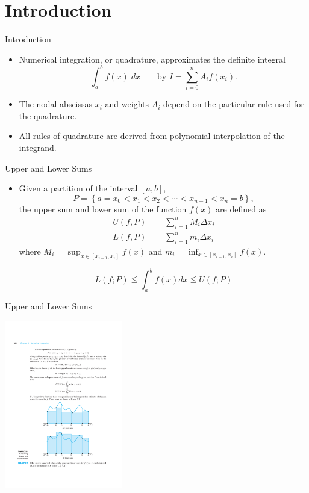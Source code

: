 \documentclass{beamer}
\newcommand{\beforeverb}{\footnotesize}
\newcommand{\afterverb}{\normalsize}
\begin{document}
\section[Introduction]{Introduction}
\begin{frame}{Introduction}
\begin{itemize}
\item Numerical integration, or \alert{quadrature}, approximates the definite integral 
\[
\int_a^b f(x)\; dx \quad \quad \text{by } I=\sum_{i=0}^n A_i f(x_i).
\]
\item The \alert{nodal abscissas} $x_i$ and \alert{weights} $A_i$ depend on the particular rule used for the quadrature.
\item All rules of quadrature are derived from \alert{ polynomial interpolation} of the integrand.
\end{itemize}
\end{frame}
\begin{frame}{Upper and Lower Sums}
  \begin{itemize} 
    \item Given a partition of the interval $[a,b]$, 
    \[
    P=\left\{a=x_0<x_1<x_2<\cdots<x_{n-1}<x_n=b\right\},
    \]
   the \alert{upper sum} and \alert{lower sum} of the function $f(x)$ are defined as
      \beforeverb
      \begin{align*}
        U(f,P)&=\sum_{i=1}^n M_i \Delta x_i\\
        L(f,P)&=\sum_{i=1}^n m_i \Delta x_i
      \end{align*}
      \afterverb
      where $M_i=\sup_{x\in[x_{i-1},x_i]} f(x)$ and $m_i=\inf_{x\in[x_{i-1},x_i]} f(x)$.

     \[
     L(f ; P) \leqq \int_a^b f(x) d x \leqq U(f ; P)
     \]
  \end{itemize}
\end{frame}
\begin{frame}{Upper and Lower Sums}
\centerline{\includegraphics[height=2.9in]{Lec12_Fig0}}
\end{frame}
\end{document}
